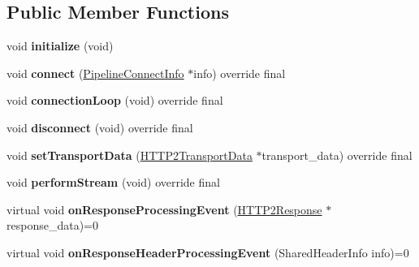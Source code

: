 \subsection*{Public Member Functions}
\begin{DoxyCompactItemize}
\item 
\mbox{\label{classhttp2_1_1HTTP2Pipeline_a9aafb16165a4c4b322b0f33305e28147}} 
void {\bfseries initialize} (void)
\item 
\mbox{\label{classhttp2_1_1HTTP2Pipeline_a7ee321bf03c89ef557ca7f83686d365e}} 
void {\bfseries connect} (\hyperlink{classhttp2_1_1PipelineConnectInfo}{Pipeline\+Connect\+Info} $\ast$info) override final
\item 
\mbox{\label{classhttp2_1_1HTTP2Pipeline_ae4d535de3147f67c0a228bd987b095c2}} 
void {\bfseries connection\+Loop} (void) override final
\item 
\mbox{\label{classhttp2_1_1HTTP2Pipeline_ac531543d68270e37250910c6633e68ac}} 
void {\bfseries disconnect} (void) override final
\item 
\mbox{\label{classhttp2_1_1HTTP2Pipeline_a9a7d5365e510b09fde550bb26179c059}} 
void {\bfseries set\+Transport\+Data} (\hyperlink{classhttp2_1_1HTTP2TransportData}{H\+T\+T\+P2\+Transport\+Data} $\ast$transport\+\_\+data) override final
\item 
\mbox{\label{classhttp2_1_1HTTP2Pipeline_a303c8497cf3b7dc93c1b7c0b813ae849}} 
void {\bfseries perform\+Stream} (void) override final
\item 
\mbox{\label{classhttp2_1_1HTTP2Pipeline_abccb5159a78ce3aa1940a8306c489183}} 
virtual void {\bfseries on\+Response\+Processing\+Event} (\hyperlink{classhttp2_1_1HTTP2Response}{H\+T\+T\+P2\+Response} $\ast$response\+\_\+data)=0
\item 
\mbox{\label{classhttp2_1_1HTTP2Pipeline_aec3dd17054d824c25ba312e532ccf694}} 
virtual void {\bfseries on\+Response\+Header\+Processing\+Event} (Shared\+Header\+Info info)=0
\item 

\end{DoxyCompactItemize}

